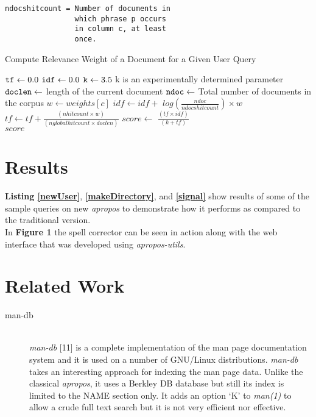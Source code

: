 \documentclass[letterpaper,twocolumn,10pt]{article}
\begin{document}
\begin{description}
{\begin{lstlisting}
ndocshitcount = Number of documents in
                which phrase p occurs
                in column c, at least
                once.
\end{lstlisting}
}
\begin{algorithm}
\caption{Compute Relevance Weight of a Document for a Given User Query}
\label{alg1}
\begin{algorithmic}[1]
\State ${\tt tf} \gets 0.0$
\State ${\tt idf} \gets 0.0$
\State ${\tt k} \gets 3.5$
\Comment 
{k is an experimentally determined parameter}
\State ${\tt doclen} \gets $ length of the current document
\State ${\tt ndoc} \gets $ Total number of documents in the corpus
\State $w \gets weights[c] $
\State $idf \gets idf + $ $log(\frac{ndoc}{ndocshitcount})\times w $
\State $tf \gets tf + \frac{(nhitcount \times w)}{(nglobalhitcount \times doclen)}$
\EndFor
\EndFor
\State $score \gets $ $\frac{(tf \times idf)}{(k + tf)}$ \\
\Return $score$
\end{algorithmic}
\end{algorithm}
\end{description}

\pagebreak
\section{Results}
{\bf Listing \ref{newUser}}, {\bf \ref{makeDirectory}}, and {\bf \ref{signal} } show results of some of the sample queries on new \textit{apropos}
to demonstrate how it performs as compared to the traditional version.
 \\

In \textbf{Figure 1} the spell corrector can be seen in action along with the web
interface that was developed using \textit{apropos-utils}. \\


\section{Related Work}
\begin{description}
\item[man-db] \hfill \\
\textit{man-db} [11] is a complete implementation of the man page documentation
system and it is used on a number of GNU/Linux distributions. \textit{man-db}
takes an interesting approach for indexing the man page data. Unlike the
classical \textit{apropos}, it uses a Berkley DB database but still its index
is limited to the NAME section only. It adds an option `K' to \textit{man(1)} to
allow a crude full text search but it is not very efficient nor effective.
\end{description}
\end{document}
